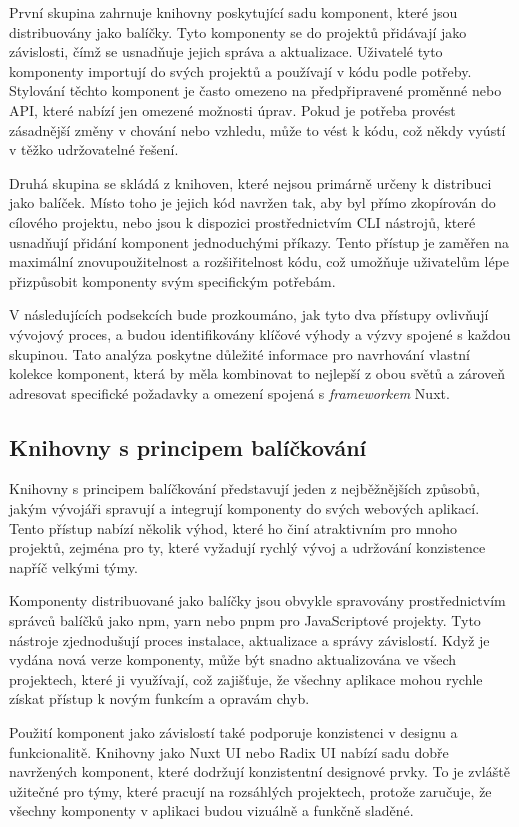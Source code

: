 První skupina zahrnuje knihovny poskytující sadu komponent, které jsou distribuovány jako balíčky. Tyto komponenty se do projektů přidávají jako závislosti, čímž se usnadňuje jejich správa a aktualizace. Uživatelé tyto komponenty importují do svých projektů a používají v kódu podle potřeby. Stylování těchto komponent je často omezeno na předpřipravené proměnné nebo API, které nabízí jen omezené možnosti úprav. Pokud je potřeba provést zásadnější změny v chování nebo vzhledu, může to vést k  kódu, což někdy vyústí v těžko udržovatelné řešení.

Druhá skupina se skládá z knihoven, které nejsou primárně určeny k distribuci jako balíček. Místo toho je jejich kód navržen tak, aby byl přímo zkopírován do cílového projektu, nebo jsou k dispozici prostřednictvím CLI nástrojů, které usnadňují přidání komponent jednoduchými příkazy. Tento přístup je zaměřen na maximální znovupoužitelnost a rozšiřitelnost kódu, což umožňuje uživatelům lépe přizpůsobit komponenty svým specifickým potřebám.

V následujících podsekcích bude prozkoumáno, jak tyto dva přístupy ovlivňují vývojový proces, a budou identifikovány klíčové výhody a výzvy spojené s každou skupinou. Tato analýza poskytne důležité informace pro navrhování vlastní kolekce komponent, která by měla kombinovat to nejlepší z obou světů a zároveň adresovat specifické požadavky a omezení spojená s \emph{frameworkem} Nuxt.

\subsection{Knihovny s principem balíčkování}
Knihovny s principem balíčkování představují jeden z nejběžnějších způsobů, jakým vývojáři spravují a integrují komponenty do svých webových aplikací. Tento přístup nabízí několik výhod, které ho činí atraktivním pro mnoho projektů, zejména pro ty, které vyžadují rychlý vývoj a udržování konzistence napříč velkými týmy.

Komponenty distribuované jako balíčky jsou obvykle spravovány prostřednictvím správců balíčků jako npm, yarn nebo pnpm pro JavaScriptové projekty. Tyto nástroje zjednodušují proces instalace, aktualizace a správy závislostí. Když je vydána nová verze komponenty, může být snadno aktualizována ve všech projektech, které ji využívají, což zajišťuje, že všechny aplikace mohou rychle získat přístup k novým funkcím a opravám chyb.

Použití komponent jako závislostí také podporuje konzistenci v designu a funkcionalitě. Knihovny jako Nuxt UI nebo Radix UI nabízí sadu dobře navržených komponent, které dodržují konzistentní designové prvky. To je zvláště užitečné pro týmy, které pracují na rozsáhlých projektech, protože zaručuje, že všechny komponenty v aplikaci budou vizuálně a funkčně sladěné.

